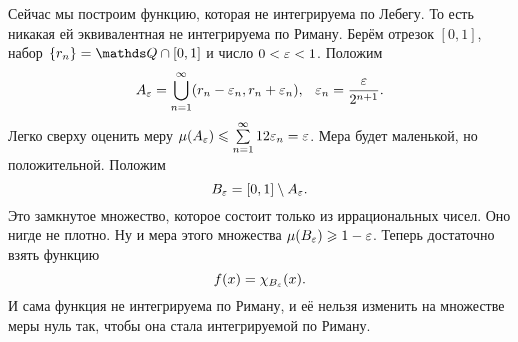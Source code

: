 Сейчас мы построим функцию, которая не интегрируема по Лебегу. То есть никакая ей эквивалентная не интегрируема по Риману. Берём отрезок $[0,1]$, набор $\{r_n\} = \Q\cap[0,1]$ и число $0<\varepsilon<1$. Положим
\[
  A_\varepsilon = \bigcup\limits_{n=1}^\infty (r_n-\varepsilon_n,r_n+\varepsilon_n),\hskip .75em plus.1em minus.08em\relax \varepsilon_n = \frac{\varepsilon}{2^{n+1}}.
\]
Легко сверху оценить меру $\mu(A_\varepsilon)\leqslant \sum\limits_{{n}={1}}^\infty1 2\varepsilon_n = \varepsilon$. Мера будет маленькой, но положительной. Положим
\[
 B_\varepsilon = [0,1]\setminus A_\varepsilon.
\]
Это замкнутое множество, которое состоит только из иррациональных чисел. Оно нигде не плотно. Ну и мера этого множества $\mu(B_\varepsilon)\geqslant 1-\varepsilon$. Теперь достаточно взять функцию
\[
  f(x) = \chi_{B_\varepsilon}(x).
\]
И сама функция не интегрируема по Риману, и её нельзя изменить на множестве меры нуль так, чтобы она стала интегрируемой по Риману.
